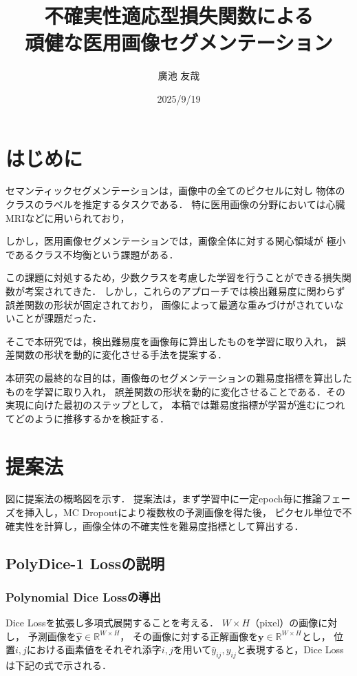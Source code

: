 \documentclass[10pt, a4paper, twocolumn]{jarticle}
\title{不確実性適応型損失関数による \\
頑健な医用画像セグメンテーション}
\author{廣池 友哉}
\affiliation{広島大学 大学院先進理工系科学研究科 情報科学プログラム}
\date{2025/9/19}
\begin{document}
\maketitle


\section{はじめに}
セマンティックセグメンテーションは，画像中の全てのピクセルに対し
物体のクラスのラベルを推定するタスクである．
特に医用画像の分野においては心臓MRIなどに用いられており，

しかし，医用画像セグメンテーションでは，画像全体に対する関心領域が
極小であるクラス不均衡という課題がある．

この課題に対処するため，少数クラスを考慮した学習を行うことができる損失関数が考案されてきた．
しかし，これらのアプローチでは検出難易度に関わらず誤差関数の形状が固定されており，
画像によって最適な重みづけがされていないことが課題だった．

そこで本研究では，検出難易度を画像毎に算出したものを学習に取り入れ，
誤差関数の形状を動的に変化させる手法を提案する．

本研究の最終的な目的は，画像毎のセグメンテーションの難易度指標を算出したものを学習に取り入れ，
誤差関数の形状を動的に変化させることである．その実現に向けた最初のステップとして，
本稿では難易度指標が学習が進むにつれてどのように推移するかを検証する．

\section{提案法}
図に提案法の概略図を示す．
提案法は，まず学習中に一定epoch毎に推論フェーズを挿入し，MC Dropoutにより複数枚の予測画像を得た後，
ピクセル単位で不確実性を計算し，画像全体の不確実性を難易度指標として算出する．

\subsection{PolyDice-1 Lossの説明}

\subsubsection{Polynomial Dice Lossの導出}
Dice Lossを拡張し多項式展開することを考える．
$W \times H$（pixel）の画像に対し，
予測画像を$\hat{\mathbf{y}} \in \mathbb R ^ {W \times H}$，
その画像に対する正解画像を$\mathbf{y} \in \mathbb R ^ {W \times H}$とし，
位置$i, j$における画素値をそれぞれ添字$i, j$を用いて$\hat{y}_{ij}, {y}_{ij}$と表現すると，Dice Lossは下記の式で示される．
\end{document}
